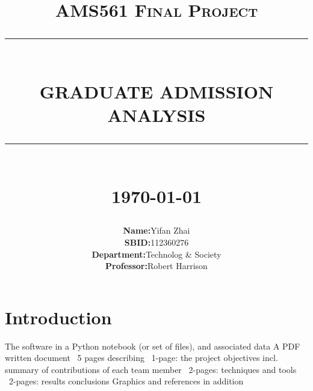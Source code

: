\documentclass[12pt]{article}
\newcommand{\HRule}[1]{\rule{\linewidth}{#1}}
\begin{document}
\begin{sloppypar}
\title{ \LARGE \textsc{AMS561 Final Project}
		\\ [2.0cm]
		\HRule{0.5pt} \\
		\LARGE \textbf{\uppercase{Graduate Admission Analysis}}
		\HRule{2pt} \\ [0.5cm]
		\normalsize \today \vspace*{5\baselineskip}}

\date{}


\author{\begin{tabular}{rl}
  \textbf{Name:} &Yifan Zhai\\
  \textbf{SBID:}  &112360276\\
  \textbf{Department:} & Technolog \& Society\\
  \textbf{Professor:} & Robert Harrison
\end{tabular}}

\maketitle
\thispagestyle{empty}
\newpage
\setcounter{page}{1}
\tableofcontents
\newpage

\section{Introduction}

The software in a Python notebook (or set of files), and associated data
A PDF written document ~5 pages describing
~1-page: the project objectives incl. summary of contributions of each team member
~2-pages: techniques and tools
~2-pages: results conclusions
Graphics and references in addition

\end{sloppypar}
\end{document}
